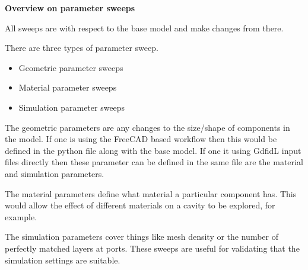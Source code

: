 \documentclass[11pt]{article}
\begin{document}
\begin{center}
\textbf{Overview on parameter sweeps}
\end{center}
All sweeps are with respect to the base model and make changes from there.

There are three types of parameter sweep.
\begin{itemize}
  \item Geometric parameter sweeps
  \item Material parameter sweeps
  \item Simulation parameter sweeps
\end{itemize}

The geometric parameters are any changes to the size/shape of components in the model. If one is using the FreeCAD based workflow then this would be defined in the python file along with the base model. If one it using GdfidL input files directly then these parameter can be defined in the same file are the material and simulation parameters.

The material parameters define what material a particular component has. This would allow the effect of different materials on a cavity to be explored, for example. 

The simulation parameters cover things like mesh density or the number of perfectly matched layers at ports. These sweeps are useful for validating that the simulation settings are suitable.
\end{document}
